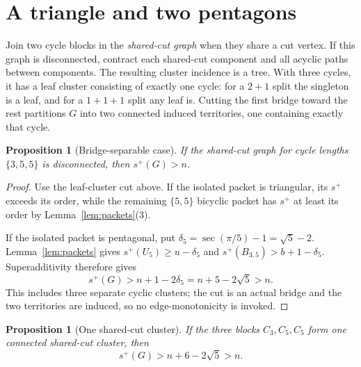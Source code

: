 \documentclass[11pt]{article}
\newtheorem{proposition}[theorem]{Proposition}
\begin{document}
\section{A triangle and two pentagons}

Join two cycle blocks in the \emph{shared-cut graph} when they share a cut
vertex.  If this graph is disconnected, contract each shared-cut component
and all acyclic paths between components.  The resulting cluster incidence is
a tree.  With three cycles, it has a leaf cluster consisting of exactly one
cycle: for a $2+1$ split the singleton is a leaf, and for a $1+1+1$ split any
leaf is.  Cutting the first bridge toward the rest partitions $G$ into two
connected induced territories, one containing exactly that cycle.

\begin{proposition}[Bridge-separable case]\label{prop:bridge}
If the shared-cut graph for cycle lengths $\{3,5,5\}$ is disconnected, then
$s^+(G)>n$.
\end{proposition}

\begin{proof}
Use the leaf-cluster cut above.  If the isolated packet is triangular, its
$s^+$ exceeds its order, while the remaining $\{5,5\}$ bicyclic packet has
$s^+$ at least its order by Lemma~\ref{lem:packets}(3).

If the isolated packet is pentagonal, put
$\delta_5=\sec(\pi/5)-1=\sqrt5-2$.  Lemma~\ref{lem:packets} gives
$s^+(U_5)\geq u-\delta_5$ and
$s^+(B_{3,5})>b+1-\delta_5$.  Superadditivity therefore gives
\[
 s^+(G)>n+1-2\delta_5=n+5-2\sqrt5>n.
\]
This includes three separate cyclic clusters; the cut is an actual bridge and
the two territories are induced, so no edge-monotonicity is invoked.
\end{proof}

\begin{proposition}[One shared-cut cluster]\label{prop:shared}
If the three blocks $C_3,C_5,C_5$ form one connected shared-cut cluster, then
\[
 s^+(G)>n+6-2\sqrt5>n.
\]
\end{proposition}
\end{document}
